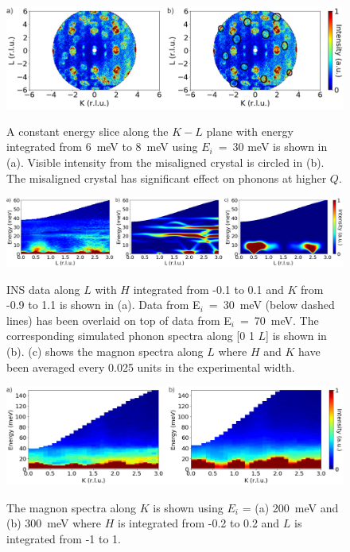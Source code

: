 \documentclass[letterpaper,10pt,doublespacing,edeposit]{uiucthesis2020}
\begin{document}
\begin{mainmatter}
\begin{figure}[h]
\centering\includegraphics[width=0.8\columnwidth]{figures/ch8/suppl_misaligned_crystal_kl_slice.png} \\
\caption{\label{fig:misaligned_elastic}
A constant energy slice along the $K-L$ plane with energy integrated from 6~meV to 8~meV using $E_i$~=~30 meV is shown in (a). Visible intensity from the misaligned crystal is circled in (b). The misaligned crystal has significant effect on phonons at higher $Q$.
}
\end{figure}


\begin{figure}[h]
\centering\includegraphics[width=\columnwidth]{figures/ch8/suppl_01L_INS_data.png} \\
\caption{\label{fig:phonon_magnon_spectra_01L}
INS data along $L$ with $H$ integrated from -0.1 to 0.1 and $K$ from -0.9 to 1.1 is shown in (a). Data from E$_i$~=~30~meV (below dashed lines) has been overlaid on top of data from E$_i$~=~70~meV. The corresponding simulated phonon spectra along [0 1 $L$] is shown in (b). (c) shows the magnon spectra along $L$ where $H$ and $K$ have been averaged every 0.025 units in the experimental width.
}
\end{figure}


\begin{figure}[h]
\centering\includegraphics[width=\columnwidth]{figures/ch8/suppl_high_energy_data.png} \\
\caption{\label{fig:high_energy_data}
The magnon spectra along $K$ is shown using $E_i$ = (a) 200~meV and (b) 300~meV where $H$ is integrated from -0.2 to 0.2 and $L$ is integrated from -1 to 1.
}
\end{figure}





\end{mainmatter}
\end{document}
